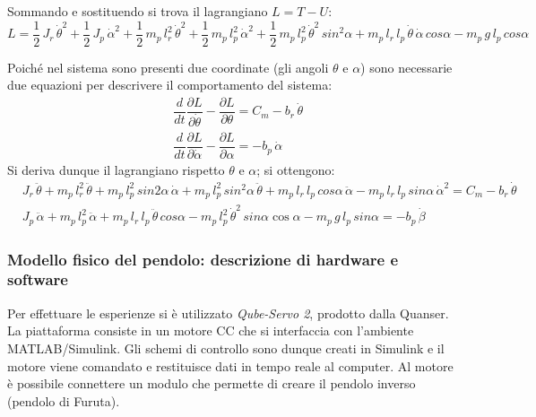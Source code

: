 \documentclass[11pt]{article}
\begin{document}
Sommando e sostituendo si trova il lagrangiano $L = T - U$:
\begin{equation}
	L = \dfrac{1}{2} \, J_r \, \dot{\theta}^2 + \dfrac{1}{2} \, J_p \, \dot{\alpha}^2 + \dfrac{1}{2} \, m_p \, l_r^2\, \dot{\theta}^2 + \dfrac{1}{2} \, m_p \, l_p^2\, \dot{\alpha}^2 + \dfrac{1}{2} \, m_p \, l_p^2\, \dot{\theta}^2\, sin^2\alpha + m_p\,l_r\,l_p\,\dot{\theta}\,\dot{\alpha}\,cos\alpha - m_p\,g\,l_p\,cos\alpha
\end{equation}



Poiché nel sistema sono presenti due coordinate (gli angoli $\theta$ e $\alpha$) sono necessarie due equazioni per descrivere il comportamento del sistema:
\begin{equation}
	\begin{aligned}
		&\dfrac{d}{dt}\dfrac{\partial L}{\partial \dot{\theta}} - \dfrac{\partial L}{\partial \theta} = C_m - b_r \, \dot{\theta} \\[2ex]
		&\dfrac{d}{dt}\dfrac{\partial L}{\partial \dot{\alpha}} - \dfrac{\partial L}{\partial \alpha} = - b_p \, \dot{\alpha}
	\end{aligned}
\end{equation}
Si deriva dunque il lagrangiano rispetto $\theta$ e $\alpha$; si ottengono:
\begin{equation}
	\begin{aligned}
		&J_r\, \ddot{\theta} + m_p\,l_r^2\, \ddot{\theta} + m_p\,l_p^2\,sin2\alpha\,\dot{\alpha} + m_p\,l_p^2\,sin^2\alpha\,\ddot{\theta}+m_p\,l_r\,l_p\,cos\alpha\,\ddot{\alpha} - m_p\,l_r\,l_p\,sin\alpha\,\dot{\alpha}^2 = C_m - b_r\, \dot{\theta}\\[1ex]
		&J_p\,\ddot{\alpha} + m_p\,l_p^2\,\ddot{\alpha} + m_p\,l_r\,l_p\,\ddot{\theta}\,cos\alpha - m_p\,l_p^2\,\dot{\theta}^2\,sin\alpha\cos\alpha - m_p\,g\,l_p\,sin\alpha= - b_p \, \dot{\beta}
	\end{aligned}
\end{equation}




\subsubsection*{Modello fisico del pendolo: descrizione di hardware e software}
Per effettuare le esperienze si è utilizzato \textit{Qube-Servo 2}, prodotto dalla Quanser. La piattaforma consiste in un motore CC che si interfaccia con l'ambiente MATLAB/Simulink. Gli schemi di controllo sono dunque creati in Simulink e il motore viene comandato e restituisce dati in tempo reale al computer.
Al motore è possibile connettere un modulo che permette di creare il pendolo inverso (pendolo di Furuta).
\end{document}
